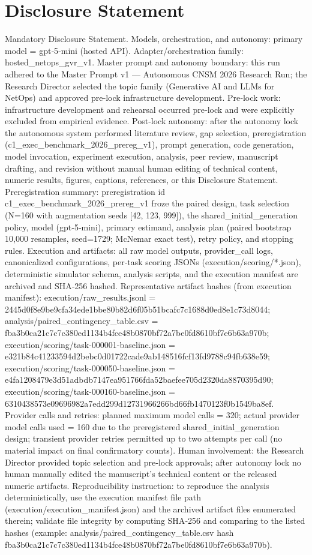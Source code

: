 \documentclass[conference]{IEEEtran}
\begin{document}
\section*{Disclosure Statement}
Mandatory Disclosure Statement. Models, orchestration, and autonomy: primary model = gpt‑5‑mini (hosted API). Adapter/orchestration family: hosted\_netops\_gvr\_v1. Master prompt and autonomy boundary: this run adhered to the Master Prompt v1 --- Autonomous CNSM 2026 Research Run; the Research Director selected the topic family (Generative AI and LLMs for NetOps) and approved pre‑lock infrastructure development. Pre‑lock work: infrastructure development and rehearsal occurred pre‑lock and were explicitly excluded from empirical evidence. Post‑lock autonomy: after the autonomy lock the autonomous system performed literature review, gap selection, preregistration (c1\_exec\_benchmark\_2026\_prereg\_v1), prompt generation, code generation, model invocation, experiment execution, analysis, peer review, manuscript drafting, and revision without manual human editing of technical content, numeric results, figures, captions, references, or this Disclosure Statement. Preregistration summary: preregistration id c1\_exec\_benchmark\_2026\_prereg\_v1 froze the paired design, task selection (N=160 with augmentation seeds [42, 123, 999]), the shared\_initial\_generation policy, model (gpt‑5‑mini), primary estimand, analysis plan (paired bootstrap 10,000 resamples, seed=1729; McNemar exact test), retry policy, and stopping rules. Execution and artifacts: all raw model outputs, provider\_call logs, canonicalized configurations, per‑task scoring JSONs (execution/scoring/*.json), deterministic simulator schema, analysis scripts, and the execution manifest are archived and SHA‑256 hashed. Representative artifact hashes (from execution manifest): execution/raw\_results.jsonl = 2445d0f8e9be9cfa34ede1bbe80b82d6f05b51bcafc7c1688d0ed8e1c73d8044; analysis/paired\_contingency\_table.csv = fba3b0ca21c7c7c380ed1134b4fce48b0870bf72a7be0fd8610bf7e6b63a970b; execution/scoring/task-000001-baseline.json = e321b84c41233594d2bebc0d01722cade9ab148516fcf13fd9788c94fb638e59; execution/scoring/task-000050-baseline.json = e4fa1208479e3d51adbdb7147ea951766fda52baefee705d2320da8870395d90; execution/scoring/task-000160-baseline.json = 6310438573e09696982a7edd299d12731966266bd66fb1470123f0b1549ba8ef. Provider calls and retries: planned maximum model calls = 320; actual provider model calls used = 160 due to the preregistered shared\_initial\_generation design; transient provider retries permitted up to two attempts per call (no material impact on final confirmatory counts). Human involvement: the Research Director provided topic selection and pre‑lock approvals; after autonomy lock no human manually edited the manuscript's technical content or the released numeric artifacts. Reproducibility instruction: to reproduce the analysis deterministically, use the execution manifest file path (execution/execution\_manifest.json) and the archived artifact files enumerated therein; validate file integrity by computing SHA‑256 and comparing to the listed hashes (example: analysis/paired\_contingency\_table.csv hash fba3b0ca21c7c7c380ed1134b4fce48b0870bf72a7be0fd8610bf7e6b63a970b).
\end{document}
